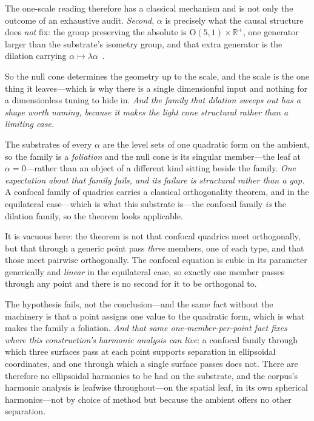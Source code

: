 \documentclass[11pt,a4paper]{article}
\theoremstyle{definition}
\begin{document}
The one-scale reading therefore has a classical mechanism and is not only the outcome of an exhaustive audit. \emph{Second}, $\alpha$ is precisely what the causal structure does \emph{not} fix: the group preserving the absolute is $\mathrm{O}(5,1)\times\mathbb{R}^{+}$, one generator larger than the substrate's isometry group, and that extra generator is the dilation carrying $\alpha\mapsto\lambda\alpha$~\cite{JanzenGroupoid}. 

So the null cone determines the geometry up to the scale, and the scale is the one thing it leaves---which is why there is a single dimensionful input and nothing for a dimensionless tuning to hide in. \emph{And the family that dilation sweeps out has a shape worth naming, because it makes the light cone structural rather than a limiting case.} 

The substrates of every $\alpha$ are the level sets of one quadratic form on the ambient, so the family is a \emph{foliation} and the null cone is its singular member---the leaf at $\alpha=0$---rather than an object of a different kind sitting beside the family. \emph{One expectation about that family fails, and its failure is structural rather than a gap.} A confocal family of quadrics carries a classical orthogonality theorem, and in the equilateral case---which is what this substrate is---the confocal family \emph{is} the dilation family, so the theorem looks applicable. 

It is vacuous here: the theorem is not that confocal quadrics meet orthogonally, but that through a generic point pass \emph{three} members, one of each type, and that those meet pairwise orthogonally. The confocal equation is cubic in its parameter generically and \emph{linear} in the equilateral case, so exactly one member passes through any point and there is no second for it to be orthogonal to. 

The hypothesis fails, not the conclusion---and the same fact without the machinery is that a point assigns one value to the quadratic form, which is what makes the family a foliation. \emph{And that same one-member-per-point fact fixes where this construction's harmonic analysis can live}: a confocal family through which three surfaces pass at each point supports separation in ellipsoidal coordinates, and one through which a single surface passes does not. There are therefore no ellipsoidal harmonics to be had on the substrate, and the corpus's harmonic analysis is leafwise throughout---on the spatial leaf, in its own spherical harmonics---not by choice of method but because the ambient offers no other separation. 
\end{document}
